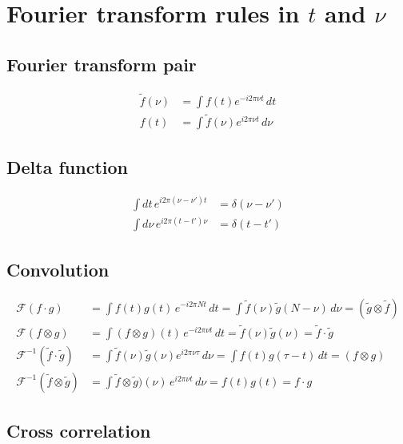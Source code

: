 \documentclass{article}
\begin{document}
\section{Fourier transform rules in $t$ and $\nu$}


\subsection{Fourier transform pair}

\begin{align*}
  \tilde{f}(\nu) &= \int f(t) e^{-i 2 \pi \nu t} \, dt \\
  f(t) &= \int \tilde{f}(\nu) e^{i 2 \pi \nu t} \, d\nu
\end{align*}

\subsection{Delta function}

\begin{align*}
  \int dt \, e^{i 2 \pi(\nu - \nu') t} &= \delta(\nu - \nu') \\
  \int d\nu \, e^{i 2 \pi(t - t') \nu} &= \delta(t - t')
\end{align*}

\subsection{Convolution}
\begin{align*}
  \mathcal{F}(f \cdot g)
  &= \int f(t) g(t) \, e^{-i 2 \pi N t} \, dt
  =  \int \tilde{f}(\nu) \tilde{g}(N - \nu) \, d\nu
  = (\tilde{g} \otimes \tilde{f}) \\
  \mathcal{F}(f \otimes g)
  &= \int (f \otimes g)(t) \, e^{-i 2 \pi \nu t} \, dt
  = \tilde{f}(\nu) \tilde{g}(\nu)
  = \tilde{f} \cdot \tilde{g} \\
  \mathcal{F}^{-1}(\tilde{f} \cdot \tilde{g})
  &= \int \tilde{f}(\nu) \tilde{g}(\nu) e^{i 2 \pi \nu \tau} \, d\nu
  = \int f(t) g(\tau - t) \, dt
  = (f \otimes g) \\
  \mathcal{F}^{-1}(\tilde{f} \otimes \tilde{g})
  &= \int \tilde{f} \otimes \tilde{g})(\nu) \, e^{i 2 \pi \nu t} \, d\nu
  = f(t) g(t)
  = f \cdot g
\end{align*}

\subsection{Cross correlation}
\end{document}
